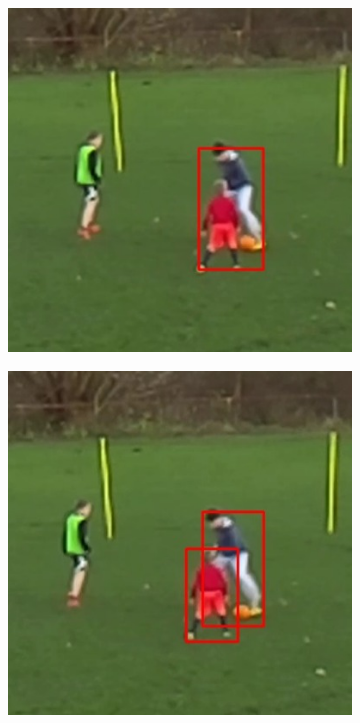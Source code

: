 \documentclass{article}
\begin{document}
\begin{figure}[h!]
  \begin{subfigure}[b]{0.5\linewidth}
  \centering
	\includegraphics[scale=0.4]{report/pic/3_new/off_1.jpg} 
  \end{subfigure}
  \begin{subfigure}[b]{0.5\linewidth}
  \centering
	\includegraphics[scale=0.4]{report/pic/3_new/on_1.jpg} 
  \end{subfigure}
  \begin{subfigure}[b]{0.5\linewidth}
  \centering

\end{subfigure}
\end{figure}
\end{document}

